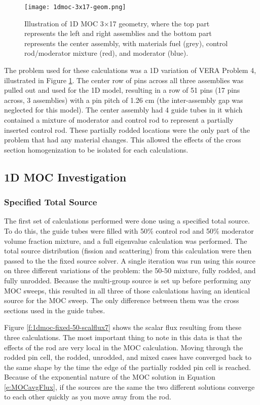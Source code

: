 \begin{figure}
    \centering
    \texttt{[image: 1dmoc-3x17-geom.png]}
    \caption[Illustration of 1D MOC 3x17 Geometry]{Illustration of 1D MOC 3$\times$17 geometry, where the top part represents the left and right assemblies and the bottom part represents the center assembly, with materials fuel (grey), control rod/moderator mixture (red), and moderator (blue).}\label{f:1dmoc-17x17-geom}
\end{figure}

The problem used for these calculations was a 1D variation of VERA Problem 4, illustrated in Figure \ref{f:1dmoc-17x17-geom}.  The center row of pins across all three assemblies was pulled out and used for the 1D model, resulting in a row of 51 pins (17 pins across, 3 assemblies) with a pin pitch of 1.26 cm (the inter-assembly gap was neglected for this model).  The center assembly had 4 guide tubes in it which contained a mixture of moderator and control rod to represent a partially inserted control rod.  These partially rodded locations were the only part of the problem that had any material changes.  This allowed the effects of the cross section homogenization to be isolated for each calculations.

\subsection{1D MOC Investigation}

\subsubsection{Specified Total Source}

The first set of calculations performed were done using a specified total source.  To do this, the guide tubes were filled with 50\% control rod and 50\% moderator volume fraction mixture, and a full eigenvalue calculation was performed.  The total source distribution (fission and scattering) from this calculation were then passed to the the fixed source solver.  A single iteration was run using this source on three different variations of the problem: the 50-50 mixture, fully rodded, and fully unrodded.  Because the multi-group source is set up before performing any MOC sweeps, this resulted in all three of those calculations having an identical source for the MOC sweep.  The only difference between them was the cross sections used in the guide tubes.

Figure \ref{f:1dmoc-fixed-50-scalflux7} shows the scalar flux resulting from these three calculations.  The most important thing to note in this data is that the effects of the rod are very local in the MOC calculation.  Moving through the rodded pin cell, the rodded, unrodded, and mixed cases have converged back to the same shape by the time the edge of the partially rodded pin cell is reached.  Because of the exponential nature of the MOC solution in Equation \ref{e:MOCavgFlux}, if the sources are the same the two different solutions converge to each other quickly as you move away from the rod.

